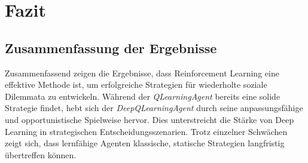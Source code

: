\chapter{Fazit}
\section{Zusammenfassung der Ergebnisse}
Zusammenfassend zeigen die Ergebnisse, dass Reinforcement Learning eine effektive Methode ist, um erfolgreiche Strategien für wiederholte 
soziale Dilemmata zu entwickeln. Während der \textit{QLearningAgent} bereits eine solide Strategie findet, hebt sich der \textit{DeepQLearningAgent} 
durch seine anpassungsfähige und opportunistische Spielweise hervor. Dies unterstreicht die Stärke von Deep Learning in strategischen 
Entscheidungsszenarien. Trotz einzelner Schwächen zeigt sich, dass lernfähige Agenten klassische, statische Strategien langfristig übertreffen können.